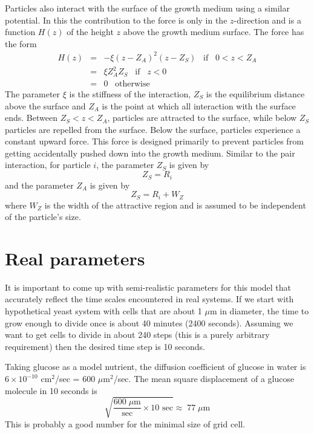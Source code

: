 \documentclass[12pt]{article}
\begin{document}
Particles also interact with the surface of the growth medium using a similar potential. In this
the contribution to the force is only in the $z$-direction and is a function $H(z)$ of the height $z$ above
the growth medium surface. The force has the form
\begin{eqnarray*}
H(z) & = & -\xi (z-Z_A)^2(z-Z_S)\;\;\;\mbox{if}\;\;\;0<z<Z_A \\
& = & \xi Z_A^2Z_S\;\;\;\mbox{if}\;\;\;z<0 \\
& = & 0\;\;\;\mbox{otherwise}
\end{eqnarray*}
The parameter $\xi$ is the stiffness of the interaction, $Z_S$ is the equilibrium distance above the surface
and $Z_A$ is the point at which all interaction with the surface ends. Between $Z_S<z<Z_A$, particles are
attracted to the surface, while below $Z_S$ particles are repelled from the surface. Below the surface,
particles experience a constant upward force. This force is designed primarily to prevent particles from
getting accidentally pushed down into the growth medium. Similar to the pair interaction, for particle $i$,
the parameter $Z_S$ is given by
\[
Z_S = R_i
\]
and the parameter $Z_A$ is given by
\[
Z_S = R_i + W_Z
\]
where $W_Z$ is the width of the attractive region and is assumed to be independent of the particle's size.

\section{Real parameters}
It is important to come up with semi-realistic parameters for this model that
accurately reflect the time scales encountered in real systems. If we start with
hypothetical yeast system with cells that are about 1 $\mu$m in diameter, the time
to grow enough to divide once is about 40 minutes (2400 seconds). Assuming we want
to get cells to divide in about 240 steps (this is a purely arbitrary requirement)
then the desired time step is 10 seconds.

Taking glucose as
a model nutrient, the diffusion coefficient of glucose in water is $6\times 10^{-10}$
cm$^2$/sec = 600 $\mu$m$^2$/sec. The mean square displacement of a glucose molecule
in 10 seconds is
\[
\sqrt{ \frac{600\;\mu\mathrm{m}}{\mbox{sec}}\times \mbox{10 sec}}
\approx\;77\;\mu\mathrm{m}
\]
This is probably a good number for the minimal size of grid cell.
\end{document}
